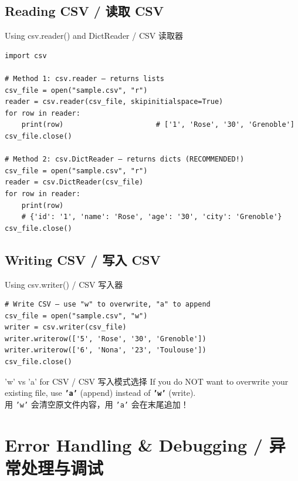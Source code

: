 \documentclass[11pt,a4paper]{report}
\let\oldtexttt\texttt
\renewcommand{\texttt}[1]{\textcolor{mainblue}{\oldtexttt{#1}}}
\begin{document}
\subsection{Reading CSV / 读取 CSV}

\begin{examplebox}{Using csv.reader() and DictReader / CSV 读取器}
\begin{lstlisting}
import csv

# Method 1: csv.reader — returns lists
csv_file = open("sample.csv", "r")
reader = csv.reader(csv_file, skipinitialspace=True)
for row in reader:
    print(row)                      # ['1', 'Rose', '30', 'Grenoble']
csv_file.close()

# Method 2: csv.DictReader — returns dicts (RECOMMENDED!)
csv_file = open("sample.csv", "r")
reader = csv.DictReader(csv_file)
for row in reader:
    print(row)
    # {'id': '1', 'name': 'Rose', 'age': '30', 'city': 'Grenoble'}
csv_file.close()
\end{lstlisting}
\end{examplebox}

\subsection{Writing CSV / 写入 CSV}

\begin{examplebox}{Using csv.writer() / CSV 写入器}
\begin{lstlisting}
# Write CSV — use "w" to overwrite, "a" to append
csv_file = open("sample.csv", "w")
writer = csv.writer(csv_file)
writer.writerow(['5', 'Rose', '30', 'Grenoble'])
writer.writerow(['6', 'Nona', '23', 'Toulouse'])
csv_file.close()
\end{lstlisting}
\end{examplebox}

\begin{warning}{'w' vs 'a' for CSV / CSV 写入模式选择}
    If you do NOT want to overwrite your existing file, use \textbf{\texttt{'a'}} (append) instead of \textbf{\texttt{'w'}} (write). \\
    用 \texttt{'w'} 会清空原文件内容，用 \texttt{'a'} 会在末尾追加！
\end{warning}

\section{Error Handling \& Debugging / 异常处理与调试}
\end{document}
